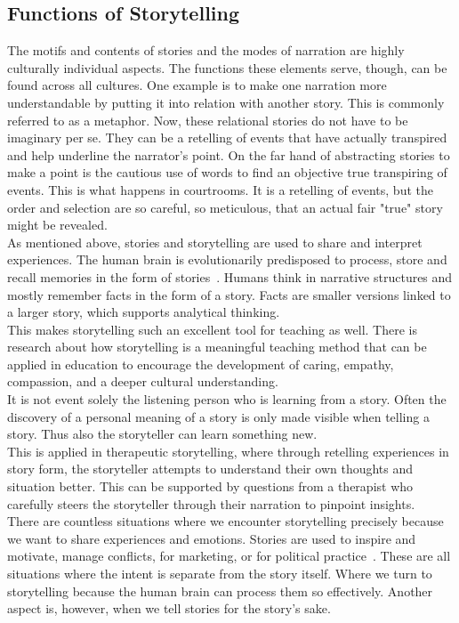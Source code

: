 \subsection{Functions of Storytelling}
The motifs and contents of stories and the modes of narration are highly culturally individual aspects. The functions these elements serve, though, can be found across all cultures. One example is to make one narration more understandable by putting it into relation with another story. This is commonly referred to as a metaphor. Now, these relational stories do not have to be imaginary per se. They can be a retelling of events that have actually transpired and help underline the narrator's point. On the far hand of abstracting stories to make a point is the cautious use of words to find an objective true transpiring of events. This is what happens in courtrooms. It is a retelling of events, but the order and selection are so careful, so meticulous, that an actual fair "true" story might be revealed.~\cite{Rigney1992}\\
As mentioned above, stories and storytelling are used to share and interpret experiences. The human brain is evolutionarily predisposed to process, store and recall memories in the form of stories~\cite{Wyer2014}. Humans think in narrative structures and mostly remember facts in the form of a story. Facts are smaller versions linked to a larger story, which supports analytical thinking.~\cite{Connelly1990}\\
This makes storytelling such an excellent tool for teaching as well. There is research about how storytelling is a meaningful teaching method that can be applied in education to encourage the development of caring, empathy, compassion, and a deeper cultural understanding.~\cite{Davidson2004}\\
It is not event solely the listening person who is learning from a story. Often the discovery of a personal meaning of a story is only made visible when telling a story. Thus also the storyteller can learn something new.~\cite{Doty2003}\\
This is applied in therapeutic storytelling, where through retelling experiences in story form, the storyteller attempts to understand their own thoughts and situation better. This can be supported by questions from a therapist who carefully steers the storyteller through their narration to pinpoint insights.~\cite{Lawless2001}\\
There are countless situations where we encounter storytelling precisely because we want to share experiences and emotions. Stories are used to inspire and motivate, manage conflicts, for marketing, or for political practice~\cite{Jameson2001}. These are all situations where the intent is separate from the story itself. Where we turn to storytelling because the human brain can process them so effectively. Another aspect is, however, when we tell stories for the story's sake.
